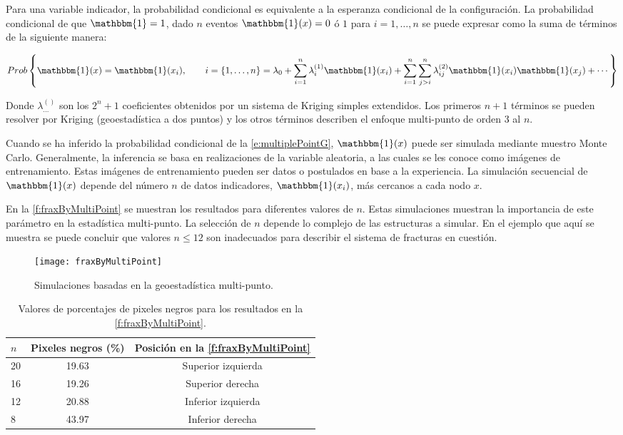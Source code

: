 Para una variable indicador, la probabilidad condicional es equivalente a la esperanza condicional de la configuraci\'on. La probabilidad condicional de que $\mathbbm{1}=1$, dado $n$ eventos $\mathbbm{1}(x) = 0$ \'o $1$ para $i = 1, \ldots, n$ se puede expresar como la suma de  t\'erminos de la siguiente manera:

\begin{equation}
	Prob
	\left\{
		\mathbbm{1} (x) = \mathbbm{1}(x_i), \qquad i = \{1,\ldots,n\}
		\\
		= \lambda_0 +
		\sum_{i=1}^n \lambda_i^{(1)} \mathbbm{1}(x_i) +
		\sum_{i=1}^n \sum_{j > i}^n \lambda_{ij}^{(2)}
		\mathbbm{1}(x_i) \mathbbm{1}(x_j) + \cdots
	\right\}
	\label{e:multiplePointG}
\end{equation}
	 	
Donde $\lambda_{\dots}^{()}$ son los $2^n+1$ coeficientes obtenidos por un sistema de Kriging simples extendidos. Los primeros $n+1$ t\'erminos se pueden resolver por Kriging (geoestad\'istica a dos puntos) y los otros t\'erminos describen el enfoque multi-punto de orden 3 al $n$.

Cuando se ha inferido la probabilidad condicional de la \autoref{e:multiplePointG}, $\mathbbm{1}(x)$ puede ser simulada mediante muestro Monte Carlo. Generalmente, la inferencia se basa en realizaciones de la variable aleatoria, a las cuales se les conoce como im\'agenes de entrenamiento. Estas im\'agenes de entrenamiento pueden ser datos o postulados en base a la experiencia. La simulaci\'on secuencial de $\mathbbm{1}(x)$ depende del n\'umero $n$ de datos indicadores, $\mathbbm{1}(x_i)$, m\'as cercanos a cada nodo $x$.

En la \autoref{f:fraxByMultiPoint} se muestran los resultados para diferentes valores de $n$. Estas simulaciones muestran la importancia de este  par\'ametro en la estad\'istica multi-punto. La selecci\'on de $n$ depende lo complejo de las estructuras a simular. En el ejemplo que aqu\'i se muestra se puede concluir que valores $n \le 12$ son inadecuados para describir el sistema de fracturas en cuesti\'on.

\begin{figure} 
	\centering
	\texttt{[image: fraxByMultiPoint]}
	\caption{Simulaciones basadas en la geoestad\'istica multi-punto.}
	\label{f:fraxByMultiPoint}
\end{figure}


\begin{table}
	\centering
\begin{tabular}{|l|c|c|}
\hline
$n$ & Pixeles negros (\%) & Posici\'on en la \autoref{f:fraxByMultiPoint} \\
\hline
\hline
20 & 19.63 & Superior izquierda\\ \hline
16 & 19.26 & Superior derecha\\ \hline
12 & 20.88 & Inferior izquierda\\ \hline  
8  & 43.97 & Inferior derecha\\ \hline
\end{tabular}
\caption{Valores de porcentajes de pixeles negros para los resultados en la \autoref{f:fraxByMultiPoint}.}
\end{table}

